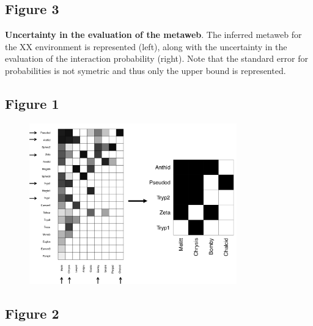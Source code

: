 \documentclass[12pt]{article}
\begin{document}
\subsection*{Figure 3}
\textbf{Uncertainty in the evaluation of the metaweb}. The inferred metaweb for the XX environment is represented (left), along with the uncertainty in the evaluation of the interaction probability (right). Note that the standard error for probabilities is not symetric and thus only the upper bound is represented. 

\newpage
\subsection*{Figure 1}

\begin{figure}[ht!]
	\centering\includegraphics[width=0.8\textwidth]{sampling}
\end{figure}

\newpage

\subsection*{Figure 2}
\end{document}
